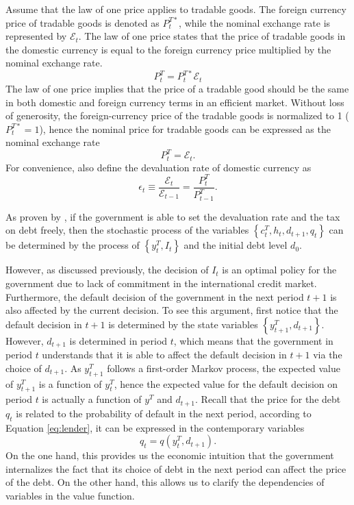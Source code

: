 Assume that the law of one price applies to tradable goods. The foreign currency price of tradable goods is denoted as $P^{T*}_t$, while the nominal exchange rate is represented by $\mathcal{E}_t$. The law of one price states that the price of tradable goods in the domestic currency is equal to the foreign currency price multiplied by the nominal exchange rate.
\begin{equation*}
    P^T_t = P^{T*}_t \mathcal{E}_t
\end{equation*}
The law of one price implies that the price of a tradable good should be the same in both domestic and foreign currency terms in an efficient market. Without loss of generosity, the foreign-currency price of the tradable goods is normalized to 1 ($P^{T*}_t = 1$), hence the nominal price for tradable goods can be expressed as the nominal exchange rate
\begin{equation}
    \label{eq:price-exrate}
    P^T_t = \mathcal{E}_t.
\end{equation}
For convenience, also define the devaluation rate of domestic currency as
\begin{equation}
    \label{eq:devaluation-rate}
    \epsilon_t \equiv \frac{\mathcal{E}_t}{\mathcal{E}_{t-1}} = \frac{P^T_t}{P^T_{t-1}}.
\end{equation}

As proven by \citet*{Na-18}, if the government is able to set the devaluation rate and the tax on debt freely, then the stochastic process of the variables $\left\{ c^T_t, h_t, d_{t+1}, q_t \right\}$ can be determined by the process of $\left\{ y^T_t, I_t\right\}$ and the initial debt level $d_0$.

However, as discussed previously, the decision of $I_t$ is an optimal policy for the government due to lack of commitment in the international credit market. Furthermore, the default decision of the government in the next period $t+1$ is also affected by the current decision. To see this argument, first notice that the default decision in $t+1$ is determined by the state variables $\left\{ y^T_{t+1}, d_{t+1} \right\}$. However, $d_{t+1}$ is determined in period $t$, which means that the government in period $t$ understands that it is able to affect the default decision in $t+1$ via the choice of $d_{t+1}$. As $y^T_{t+1}$ follows a first-order Markov process, the expected value of $y^T_{t+1}$ is a function of $y^T_t$, hence the expected value for the default decision on period $t$ is actually a function of $y^T$ and $d_{t+1}$. Recall that the price for the debt $q_t$ is related to the probability of default in the next period, according to Equation \eqref{eq:lender}, it can be expressed in the contemporary variables
\begin{equation}
    q_t = q(y^T_t, d_{t+1}).
\end{equation}
On the one hand, this provides us the economic intuition that the government internalizes the fact that its choice of debt in the next period can affect the price of the debt. On the other hand, this allows us to clarify the dependencies of variables in the value function.